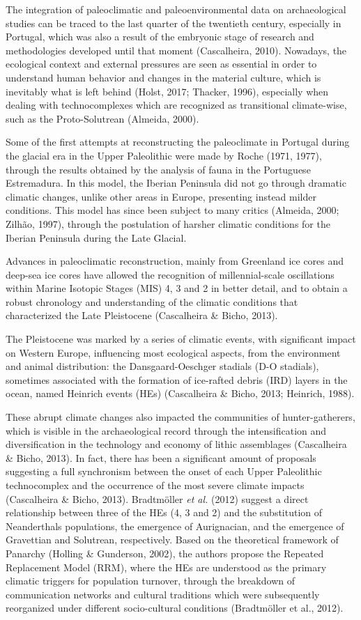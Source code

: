 \documentclass[12pt,twoside]{reedthesis}
\begin{document}
The integration of paleoclimatic and paleoenvironmental data on archaeological studies can be traced to the last quarter of the twentieth century, especially in Portugal, which was also a result of the embryonic stage of research and methodologies developed until that moment (Cascalheira, 2010). Nowadays, the ecological context and external pressures are seen as essential in order to understand human behavior and changes in the material culture, which is inevitably what is left behind (Holst, 2017; Thacker, 1996), especially when dealing with technocomplexes which are recognized as transitional climate-wise, such as the Proto-Solutrean (Almeida, 2000).

Some of the first attempts at reconstructing the paleoclimate in Portugal during the glacial era in the Upper Paleolithic were made by Roche (1971, 1977), through the results obtained by the analysis of fauna in the Portuguese Estremadura. In this model, the Iberian Peninsula did not go through dramatic climatic changes, unlike other areas in Europe, presenting instead milder conditions. This model has since been subject to many critics (Almeida, 2000; Zilhão, 1997), through the postulation of harsher climatic conditions for the Iberian Peninsula during the Late Glacial.

Advances in paleoclimatic reconstruction, mainly from Greenland ice cores and deep-sea ice cores have allowed the recognition of millennial-scale oscillations within Marine Isotopic Stages (MIS) 4, 3 and 2 in better detail, and to obtain a robust chronology and understanding of the climatic conditions that characterized the Late Pleistocene (Cascalheira \& Bicho, 2013).

The Pleistocene was marked by a series of climatic events, with significant impact on Western Europe, influencing most ecological aspects, from the environment and animal distribution: the Dansgaard-Oeschger stadials (D-O stadials), sometimes associated with the formation of ice-rafted debris (IRD) layers in the ocean, named Heinrich events (HEs) (Cascalheira \& Bicho, 2013; Heinrich, 1988).

These abrupt climate changes also impacted the communities of hunter-gatherers, which is visible in the archaeological record through the intensification and diversification in the technology and economy of lithic assemblages (Cascalheira \& Bicho, 2013). In fact, there has been a significant amount of proposals suggesting a full synchronism between the onset of each Upper Paleolithic technocomplex and the occurrence of the most severe climate impacts (Cascalheira \& Bicho, 2013). Bradtmöller \emph{et al.} (2012) suggest a direct relationship between three of the HEs (4, 3 and 2) and the substitution of Neanderthals populations, the emergence of Aurignacian, and the emergence of Gravettian and Solutrean, respectively. Based on the theoretical framework of Panarchy (Holling \& Gunderson, 2002), the authors propose the Repeated Replacement Model (RRM), where the HEs are understood as the primary climatic triggers for population turnover, through the breakdown of communication networks and cultural traditions which were subsequently reorganized under different socio-cultural conditions (Bradtmöller et al., 2012).
\end{document}
